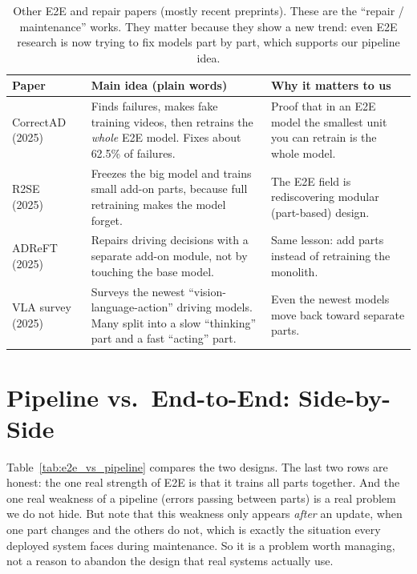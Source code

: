 \documentclass[11pt,a4paper]{article}
\begin{document}
\begin{table}[h!]
\centering
\caption{Other E2E and repair papers (mostly recent preprints).
These are the ``repair / maintenance'' works. They matter because they
show a new trend: even E2E research is now trying to fix models part by
part, which supports our pipeline idea.}
\label{tab:e2e_extra}
\small
\renewcommand{\arraystretch}{1.3}
\begin{tabular}{@{}L{2.4cm}L{6.7cm}L{4.0cm}@{}}
\toprule
\textbf{Paper} & \textbf{Main idea (plain words)} & \textbf{Why it matters to us} \\
\midrule
CorrectAD~\cite{ma2025correctad} (2025) &
Finds failures, makes fake training videos, then retrains the
\emph{whole} E2E model. Fixes about 62.5\% of failures. &
Proof that in an E2E model the smallest unit you can retrain is the whole
model. \\
R2SE~\cite{liu2025r2se} (2025) &
Freezes the big model and trains small add-on parts, because full
retraining makes the model forget. &
The E2E field is rediscovering modular (part-based) design. \\
ADReFT~\cite{cheng2025adreft} (2025) &
Repairs driving decisions with a separate add-on module, not by touching
the base model. &
Same lesson: add parts instead of retraining the monolith. \\
VLA survey~\cite{hu2025vla} (2025) &
Surveys the newest ``vision-language-action'' driving models. Many split
into a slow ``thinking'' part and a fast ``acting'' part. &
Even the newest models move back toward separate parts. \\
\bottomrule
\end{tabular}
\end{table}

\section{Pipeline vs.\ End-to-End: Side-by-Side}

Table~\ref{tab:e2e_vs_pipeline} compares the two designs. The last two
rows are honest: the one real strength of E2E is that it trains all parts
together. And the one real weakness of a pipeline (errors passing between
parts) is a real problem we do not hide. But note that this weakness only
appears \emph{after} an update, when one part changes and the others do
not, which is exactly the situation every deployed system faces during
maintenance. So it is a problem worth managing, not a reason to abandon
the design that real systems actually use.
\end{document}
